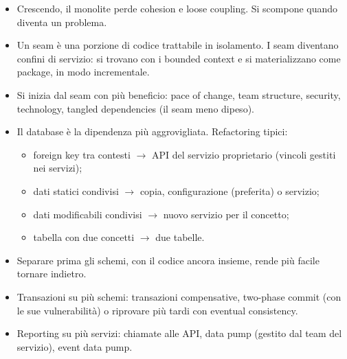 \begin{puntichiave}
\begin{itemize}
  \item Crescendo, il monolite perde cohesion e loose coupling. Si scompone quando diventa un problema.
  \item Un seam è una porzione di codice trattabile in isolamento. I seam diventano confini di servizio: si trovano con i
    bounded context e si materializzano come package, in modo incrementale.
  \item Si inizia dal seam con più beneficio: pace of change, team structure, security, technology, tangled dependencies
    (il seam meno dipeso).
  \item Il database è la dipendenza più aggrovigliata. Refactoring tipici:
    \begin{itemize}
      \item foreign key tra contesti $\to$ API del servizio proprietario (vincoli gestiti nei servizi);
      \item dati statici condivisi $\to$ copia, configurazione (preferita) o servizio;
      \item dati modificabili condivisi $\to$ nuovo servizio per il concetto;
      \item tabella con due concetti $\to$ due tabelle.
    \end{itemize}
  \item Separare prima gli schemi, con il codice ancora insieme, rende più facile tornare indietro.
  \item Transazioni su più schemi: transazioni compensative, two-phase commit (con le sue vulnerabilità) o riprovare più
    tardi con eventual consistency.
  \item Reporting su più servizi: chiamate alle API, data pump (gestito dal team del servizio), event data pump.
\end{itemize}
\end{puntichiave}

